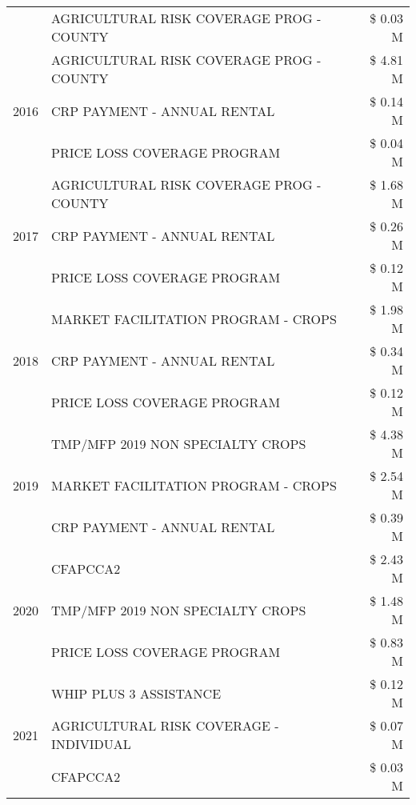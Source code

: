 \begin{tabular}{llr}
 & AGRICULTURAL RISK COVERAGE PROG - COUNTY & \$ 0.03 M \\
\cline{1-3}
\multirow[t]{3}{*}{2016} & AGRICULTURAL RISK COVERAGE PROG - COUNTY      & \$ 4.81 M \\
 & CRP PAYMENT - ANNUAL RENTAL                   & \$ 0.14 M \\
 & PRICE LOSS COVERAGE PROGRAM                   & \$ 0.04 M \\
\cline{1-3}
\multirow[t]{3}{*}{2017} & AGRICULTURAL RISK COVERAGE PROG - COUNTY & \$ 1.68 M \\
 & CRP PAYMENT - ANNUAL RENTAL & \$ 0.26 M \\
 & PRICE LOSS COVERAGE PROGRAM & \$ 0.12 M \\
\cline{1-3}
\multirow[t]{3}{*}{2018} & MARKET FACILITATION PROGRAM - CROPS & \$ 1.98 M \\
 & CRP PAYMENT - ANNUAL RENTAL & \$ 0.34 M \\
 & PRICE LOSS COVERAGE PROGRAM & \$ 0.12 M \\
\cline{1-3}
\multirow[t]{3}{*}{2019} & TMP/MFP 2019 NON SPECIALTY CROPS & \$ 4.38 M \\
 & MARKET FACILITATION PROGRAM - CROPS & \$ 2.54 M \\
 & CRP PAYMENT - ANNUAL RENTAL & \$ 0.39 M \\
\cline{1-3}
\multirow[t]{3}{*}{2020} & CFAPCCA2 & \$ 2.43 M \\
 & TMP/MFP 2019 NON SPECIALTY CROPS & \$ 1.48 M \\
 & PRICE LOSS COVERAGE PROGRAM & \$ 0.83 M \\
\cline{1-3}
\multirow[t]{3}{*}{2021} & WHIP PLUS 3 ASSISTANCE & \$ 0.12 M \\
 & AGRICULTURAL RISK COVERAGE - INDIVIDUAL & \$ 0.07 M \\
 & CFAPCCA2 & \$ 0.03 M \\
\cline{1-3}
\bottomrule
\end{tabular}
